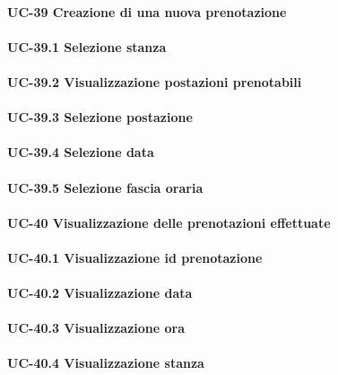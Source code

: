
\paragraph{UC-39 Creazione di una nuova prenotazione}

    \paragraph{UC-39.1 Selezione stanza}

    \paragraph{UC-39.2 Visualizzazione postazioni prenotabili}

    \paragraph{UC-39.3 Selezione postazione}

    \paragraph{UC-39.4 Selezione data}

    \paragraph{UC-39.5 Selezione fascia oraria}
  
\paragraph{UC-40 Visualizzazione delle prenotazioni effettuate}

    \paragraph{UC-40.1 Visualizzazione id prenotazione} %

    \paragraph{UC-40.2 Visualizzazione data}

    \paragraph{UC-40.3 Visualizzazione ora}

    \paragraph{UC-40.4 Visualizzazione stanza}


